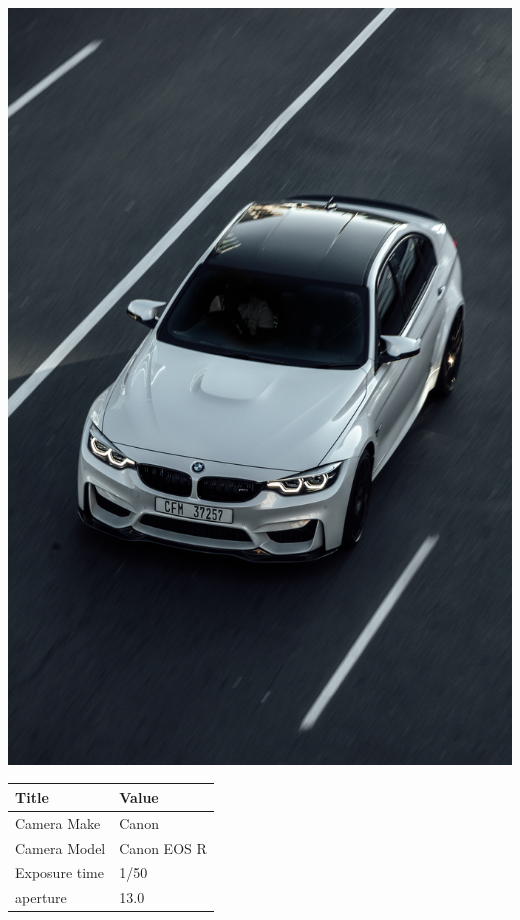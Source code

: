 \documentclass[twocolumn]{article}
\begin{document}
\begin{center}
\includegraphics[width=0.7\columnwidth]{Image5}
\newline
\newline
\newline
\newline
\newline
\begin{tabular}{| m{3cm} | m{3cm} |}
\hline

Title  &  Value   \\

\hline
Camera Make  & Canon   \\
\hline
Camera Model  & Canon EOS R   \\
\hline
Exposure time  & 1/50  \\
\hline
aperture & 13.0 \\
\hline


\end{tabular}


\end{center}

\pagebreak
\end{document}

